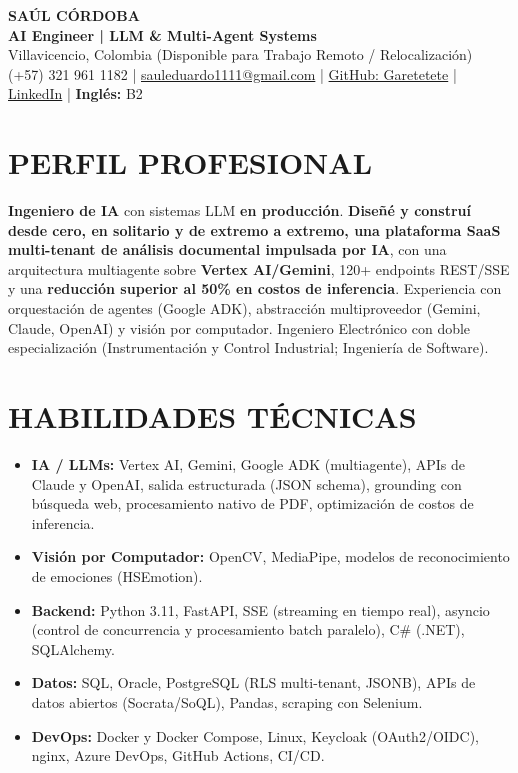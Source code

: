 \documentclass[letterpaper,10pt]{article}
\begin{document}
\begin{center}
    {\Huge \bfseries SAÚL CÓRDOBA} \\[3pt]
    {\Large \textbf{AI Engineer | LLM \& Multi-Agent Systems}} \\[2pt]
    Villavicencio, Colombia (Disponible para Trabajo Remoto / Relocalización) \\
    (+57) 321 961 1182 | \href{mailto:sauleduardo1111@gmail.com}{sauleduardo1111@gmail.com} | \href{https://github.com/Garetetete}{GitHub: Garetetete} | \href{https://www.linkedin.com/in/saul-cordoba-a2997427b}{LinkedIn} | \textbf{Inglés:} B2
\end{center}

\section{PERFIL PROFESIONAL}
\textbf{Ingeniero de IA} con sistemas LLM \textbf{en producción}. \textbf{Diseñé y construí desde cero, en solitario y de extremo a extremo, una plataforma SaaS multi-tenant de análisis documental impulsada por IA}, con una arquitectura multiagente sobre \textbf{Vertex AI/Gemini}, 120+ endpoints REST/SSE y una \textbf{reducción superior al 50\% en costos de inferencia}. Experiencia con orquestación de agentes (Google ADK), abstracción multiproveedor (Gemini, Claude, OpenAI) y visión por computador. Ingeniero Electrónico con doble especialización (Instrumentación y Control Industrial; Ingeniería de Software).

\section{HABILIDADES TÉCNICAS}
\begin{itemize}
    \item \textbf{IA / LLMs:} Vertex AI, Gemini, Google ADK (multiagente), APIs de Claude y OpenAI, salida estructurada (JSON schema), grounding con búsqueda web, procesamiento nativo de PDF, optimización de costos de inferencia.
    \item \textbf{Visión por Computador:} OpenCV, MediaPipe, modelos de reconocimiento de emociones (HSEmotion).
    \item \textbf{Backend:} Python 3.11, FastAPI, SSE (streaming en tiempo real), asyncio (control de concurrencia y procesamiento batch paralelo), C\# (.NET), SQLAlchemy.
    \item \textbf{Datos:} SQL, Oracle, PostgreSQL (RLS multi-tenant, JSONB), APIs de datos abiertos (Socrata/SoQL), Pandas, scraping con Selenium.
    \item \textbf{DevOps:} Docker y Docker Compose, Linux, Keycloak (OAuth2/OIDC), nginx, Azure DevOps, GitHub Actions, CI/CD.
\end{itemize}
\end{document}
